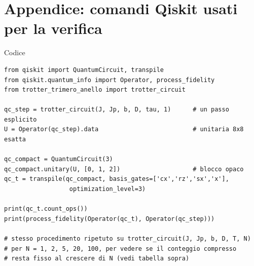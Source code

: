 \documentclass[11pt,a4paper]{article}
\begin{document}
\section*{Appendice: comandi Qiskit usati per la verifica}

\begin{panelbox}{Codice}
\small
\begin{verbatim}
from qiskit import QuantumCircuit, transpile
from qiskit.quantum_info import Operator, process_fidelity
from trotter_trimero_anello import trotter_circuit

qc_step = trotter_circuit(J, Jp, b, D, tau, 1)      # un passo esplicito
U = Operator(qc_step).data                          # unitaria 8x8 esatta

qc_compact = QuantumCircuit(3)
qc_compact.unitary(U, [0, 1, 2])                    # blocco opaco
qc_t = transpile(qc_compact, basis_gates=['cx','rz','sx','x'],
                  optimization_level=3)

print(qc_t.count_ops())
print(process_fidelity(Operator(qc_t), Operator(qc_step)))

# stesso procedimento ripetuto su trotter_circuit(J, Jp, b, D, T, N)
# per N = 1, 2, 5, 20, 100, per vedere se il conteggio compresso
# resta fisso al crescere di N (vedi tabella sopra)
\end{verbatim}
\end{panelbox}
\end{document}
